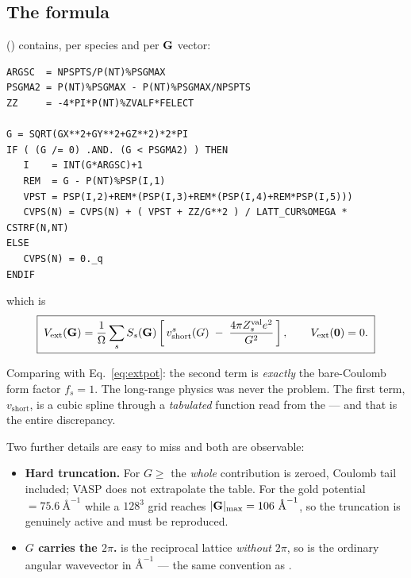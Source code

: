 \subsection{The formula}

 () contains, per species and per $\mathbf{G}$ vector:

\begin{lstlisting}[style=fortran]
ARGSC  = NPSPTS/P(NT)%PSGMAX
PSGMA2 = P(NT)%PSGMAX - P(NT)%PSGMAX/NPSPTS
ZZ     = -4*PI*P(NT)%ZVALF*FELECT

G = SQRT(GX**2+GY**2+GZ**2)*2*PI
IF ( (G /= 0) .AND. (G < PSGMA2) ) THEN
   I    = INT(G*ARGSC)+1
   REM  = G - P(NT)%PSP(I,1)
   VPST = PSP(I,2)+REM*(PSP(I,3)+REM*(PSP(I,4)+REM*PSP(I,5)))
   CVPS(N) = CVPS(N) + ( VPST + ZZ/G**2 ) / LATT_CUR%OMEGA * CSTRF(N,NT)
ELSE
   CVPS(N) = 0._q
ENDIF
\end{lstlisting}

which is
\begin{equation}
  \boxed{\;
  V_{\mathrm{ext}}(\mathbf{G}) = \frac{1}{\Omega}\sum_{s} S_s(\mathbf{G})
    \left[\, v^{s}_{\mathrm{short}}(G)
      \;-\; \frac{4\pi Z^{\mathrm{val}}_{s} e^{2}}{G^{2}} \,\right],
  \qquad V_{\mathrm{ext}}(\bm{0}) = 0 . \;}
  \label{eq:vaspextcar}
\end{equation}

Comparing with Eq.~\eqref{eq:extpot}: the second term is \emph{exactly} the
bare-Coulomb form factor $f_s = 1$. The long-range physics was never the
problem. The first term, $v_{\mathrm{short}}$, is a cubic spline through a
\emph{tabulated} function read from the  --- and that is the entire
discrepancy.

Two further details are easy to miss and both are observable:

\begin{itemize}
  \item \textbf{Hard truncation.} For $G \ge$  the \emph{whole}
    contribution is zeroed, Coulomb tail included; VASP does not extrapolate
    the table. For the gold potential  $=75.6\ \text{\AA}^{-1}$
    while a $128^3$ grid reaches $|\GG|_{\max}=106\ \text{\AA}^{-1}$, so the
    truncation is genuinely active and must be reproduced.
  \item \textbf{$G$ carries the $2\pi$.}  is the reciprocal
    lattice \emph{without} $2\pi$, so  is the ordinary angular
    wavevector in $\text{\AA}^{-1}$ --- the same convention as
    .
\end{itemize}

